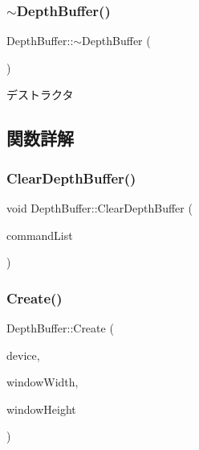 \subsubsection{\texorpdfstring{$\sim$\+Depth\+Buffer()}{~DepthBuffer()}}
{\footnotesize\ttfamily Depth\+Buffer\+::$\sim$\+Depth\+Buffer (\begin{DoxyParamCaption}{ }\end{DoxyParamCaption})}



デストラクタ 



\subsection{関数詳解}
\mbox{\label{class_depth_buffer_a673f6120808ac749fe900b21b6361bce}} 
\subsubsection{\texorpdfstring{Clear\+Depth\+Buffer()}{ClearDepthBuffer()}}
{\footnotesize\ttfamily void Depth\+Buffer\+::\+Clear\+Depth\+Buffer (\begin{DoxyParamCaption}\item[{Com\+Ptr$<$ I\+D3\+D12\+Graphics\+Command\+List $>$}]{command\+List }\end{DoxyParamCaption})}

\mbox{\label{class_depth_buffer_a1c465b15498fc12a41662562cde74b83}} 
\subsubsection{\texorpdfstring{Create()}{Create()}}
{\footnotesize\ttfamily Depth\+Buffer\+::\+Create (\begin{DoxyParamCaption}\item[{Com\+Ptr$<$ I\+D3\+D12\+Device $>$}]{device,  }\item[{int}]{window\+Width,  }\item[{int}]{window\+Height }\end{DoxyParamCaption})\hspace{0.3cm}{\ttfamily [static]}}

